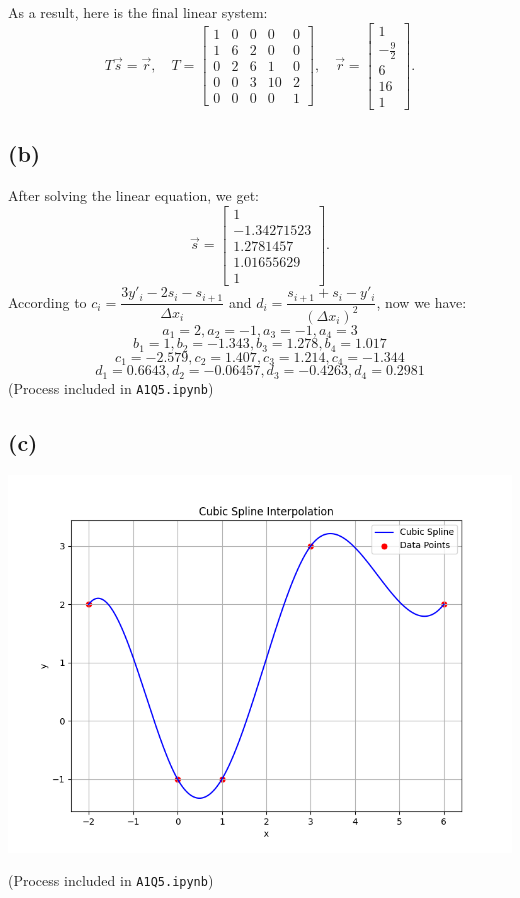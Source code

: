 \documentclass{article}
\begin{document}
As a result, here is the final linear system:
$$
    T \vec{s} = \vec{r}, \quad
    T =
    \begin{bmatrix}
        1 & 0 & 0 & 0  & 0 \\
        1 & 6 & 2 & 0  & 0 \\
        0 & 2 & 6 & 1  & 0 \\
        0 & 0 & 3 & 10 & 2 \\
        0 & 0 & 0 & 0  & 1
    \end{bmatrix}, \quad
    \vec{r} =
    \begin{bmatrix}
        1            \\
        -\frac{9}{2} \\
        6            \\
        16 \\
        1
    \end{bmatrix}.
$$

\subsection*{(b)}
After solving the linear equation, we get:
$$
    \vec{s} =
    \begin{bmatrix}
        1          \\
        -1.34271523\\
        1.2781457\\
        1.01655629\\
        1
    \end{bmatrix}.
$$
According to $c_i=\dfrac{3y'_i-2s_i-s_{i+1}}{\Delta x_i}$ and $d_i=\dfrac{s_{i+1}+s_i-y'_i}{(\Delta x_i)^2}$, now we have:
$$
    a_1=2, a_2=-1, a_3=-1, a_4=3
$$
$$
    b_1=1, b_2=-1.343, b_3=1.278, b_4=1.017
$$
$$
    c_1=-2.579, c_2=1.407, c_3=1.214, c_4=-1.344
$$
$$
    d_1=0.6643, d_2=-0.06457, d_3=-0.4263, d_4=0.2981
$$
(Process included in \texttt{A1Q5.ipynb})

\subsection*{(c)}
\begin{center}
    \includegraphics[scale=0.78, keepaspectratio]{q5c.png}
\end{center}
(Process included in \texttt{A1Q5.ipynb})
\end{document}
